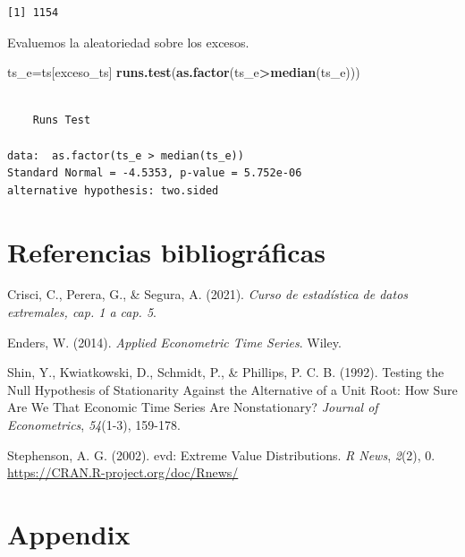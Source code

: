 \documentclass[
  12pt]{article}
\newenvironment{Shaded}{\begin{snugshade}}{\end{snugshade}}
\newcommand{\FunctionTok}[1]{\textcolor[rgb]{0.13,0.29,0.53}{\textbf{#1}}}
\newcommand{\NormalTok}[1]{#1}
\newcommand{\OtherTok}[1]{\textcolor[rgb]{0.56,0.35,0.01}{#1}}
\newcommand{\SpecialCharTok}[1]{\textcolor[rgb]{0.81,0.36,0.00}{\textbf{#1}}}
\newlength{\cslhangindent}
\newenvironment{CSLReferences}[2] %
 {\begin{list}{}{%
  \setlength{\itemindent}{0pt}
  \setlength{\leftmargin}{0pt}
  \setlength{\parsep}{0pt}
  \ifodd #1
   \setlength{\leftmargin}{\cslhangindent}
   \setlength{\itemindent}{-1\cslhangindent}
  \fi
  \setlength{\itemsep}{#2\baselineskip}}}
 {\end{list}}
\begin{document}
\begin{Shaded}
\end{Shaded}

\begin{verbatim}
[1] 1154
\end{verbatim}

Evaluemos la aleatoriedad sobre los excesos.

\begin{Shaded}
\begin{Highlighting}[]
\NormalTok{ts\_e}\OtherTok{=}\NormalTok{ts[exceso\_ts]}
\FunctionTok{runs.test}\NormalTok{(}\FunctionTok{as.factor}\NormalTok{(ts\_e}\SpecialCharTok{\textgreater{}}\FunctionTok{median}\NormalTok{(ts\_e)))}
\end{Highlighting}
\end{Shaded}

\begin{verbatim}

    Runs Test

data:  as.factor(ts_e > median(ts_e))
Standard Normal = -4.5353, p-value = 5.752e-06
alternative hypothesis: two.sided
\end{verbatim}

\newpage

\section{Referencias bibliográficas}

\label{refs}
\begin{CSLReferences}{1}{0}
Crisci, C., Perera, G., \& Segura, A. (2021). \emph{Curso de estadística
de datos extremales, cap. 1 a cap. 5}.

Enders, W. (2014). \emph{Applied Econometric Time Series}. Wiley.

Shin, Y., Kwiatkowski, D., Schmidt, P., \& Phillips, P. C. B. (1992).
Testing the Null Hypothesis of Stationarity Against the Alternative of a
Unit Root: How Sure Are We That Economic Time Series Are Nonstationary?
\emph{Journal of Econometrics}, \emph{54}(1-3), 159-178.

Stephenson, A. G. (2002). evd: Extreme Value Distributions. \emph{R
News}, \emph{2}(2), 0. \url{https://CRAN.R-project.org/doc/Rnews/}

\end{CSLReferences}

\newpage

\section{Appendix}\label{appendix}
\end{document}

